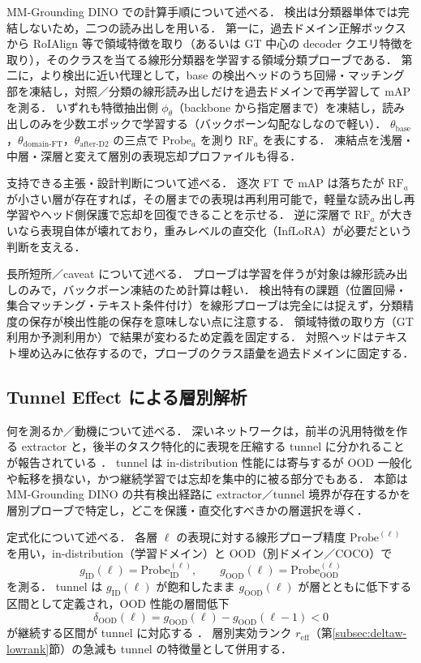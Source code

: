 MM-Grounding DINO での計算手順について述べる．
検出は分類器単体では完結しないため，二つの読み出しを用いる．
第一に，過去ドメイン正解ボックスから RoIAlign 等で領域特徴を取り（あるいは GT 中心の decoder クエリ特徴を取り），そのクラスを当てる線形分類器を学習する領域分類プローブである．
第二に，より検出に近い代理として，base の検出ヘッドのうち回帰・マッチング部を凍結し，対照／分類の線形読み出しだけを過去ドメインで再学習して mAP を測る．
いずれも特徴抽出側 $\phi_\theta$（backbone から指定層まで）を凍結し，読み出しのみを少数エポックで学習する（バックボーン勾配なしなので軽い）．
$\theta_{\mathrm{base}}$，$\theta_{\mathrm{domain\text{-}FT}}$，$\theta_{\mathrm{after\text{-}D2}}$ の三点で $\mathrm{Probe}_a$ を測り $\mathrm{RF}_a$ を表にする．
凍結点を浅層・中層・深層と変えて層別の表現忘却プロファイルも得る．

支持できる主張・設計判断について述べる．
逐次 FT で mAP は落ちたが $\mathrm{RF}_a$ が小さい層が存在すれば，その層までの表現は再利用可能で，軽量な読み出し再学習やヘッド側保護で忘却を回復できることを示せる．
逆に深層で $\mathrm{RF}_a$ が大きいなら表現自体が壊れており，重みレベルの直交化（InfLoRA）が必要だという判断を支える．

長所短所／caveat について述べる．
プローブは学習を伴うが対象は線形読み出しのみで，バックボーン凍結のため計算は軽い．
検出特有の課題（位置回帰・集合マッチング・テキスト条件付け）を線形プローブは完全には捉えず，分類精度の保存が検出性能の保存を意味しない点に注意する．
領域特徴の取り方（GT 利用か予測利用か）で結果が変わるため定義を固定する．
対照ヘッドはテキスト埋め込みに依存するので，プローブのクラス語彙を過去ドメインに固定する．


\subsection{Tunnel Effect による層別解析}
\label{subsec:tunnel}

何を測るか／動機について述べる．
深いネットワークは，前半の汎用特徴を作る extractor と，後半のタスク特化的に表現を圧縮する tunnel に分かれることが報告されている \cite{tunnel}．
tunnel は in-distribution 性能には寄与するが OOD 一般化や転移を損ない，かつ継続学習では忘却を集中的に被る部分でもある．
本節は MM-Grounding DINO の共有検出経路に extractor／tunnel 境界が存在するかを層別プローブで特定し，どこを保護・直交化すべきかの層選択を導く．

定式化について述べる．
各層 $\ell$ の表現に対する線形プローブ精度 $\mathrm{Probe}^{(\ell)}$ を用い，in-distribution（学習ドメイン）と OOD（別ドメイン／COCO）で
\begin{equation}
g_{\mathrm{ID}}(\ell) = \mathrm{Probe}^{(\ell)}_{\mathrm{ID}}, \qquad g_{\mathrm{OOD}}(\ell) = \mathrm{Probe}^{(\ell)}_{\mathrm{OOD}}
\end{equation}
を測る．
tunnel は $g_{\mathrm{ID}}(\ell)$ が飽和したまま $g_{\mathrm{OOD}}(\ell)$ が層とともに低下する区間として定義され，OOD 性能の層間低下
\begin{equation}
\delta_{\mathrm{OOD}}(\ell) = g_{\mathrm{OOD}}(\ell) - g_{\mathrm{OOD}}(\ell-1) < 0
\end{equation}
が継続する区間が tunnel に対応する \cite{tunnel}．
層別実効ランク $r_{\mathrm{eff}}$（第\ref{subsec:deltaw-lowrank}節）の急減も tunnel の特徴量として併用する．

